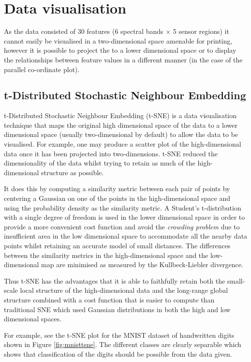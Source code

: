 \section{Data visualisation}

As the data consisted of 30 features (6 spectral bands $\times$ 5 sensor regions) it cannot easily be visualised in a two-dimensional space amenable for printing, however it is possible to project the to a lower dimensional space or to display the relationships between feature values in a different manner (in the case of the parallel co-ordinate plot).


\subsection{t-Distributed Stochastic Neighbour Embedding}

t-Distributed Stochastic Neighbour Embedding (t-SNE)\cite{Maaten2008} is a data visualisation technique that maps the original high dimensional space of the data to a lower dimensional space (usually two-dimensional by default) to allow the data to be visualised. For example, one may produce a scatter plot of the high-dimensional data once it has been projected into two-dimensions. t-SNE reduced the dimensionality of the data whilst trying to retain as much of the high-dimensional structure as possible.

 It does this by computing a similarity metric between each pair of points by centering a Gaussian on one of the points in the high-dimensional space and using the probability density as the similarity metric. A Student's t-distribution with a single degree of freedom is used in the lower dimensional space in order to provide a more convenient cost function and avoid the \textit{crowding problem} due to insufficient area in the low dimensional space to accommodate all the nearby data points whilst retaining an accurate model of small distances. The differences between the similarity metrics in the high-dimensional space and the low-dimensional map are minimised as measured by the Kullbeck-Liebler divergence.\cite{Maaten2008}

 Thus t-SNE has the advantages that it is able to faithfully retain both the small-scale local structure of the high-dimensional data and the long-range global structure combined with a cost function that is easier to compute than traditional SNE which used Gaussian distributions in both the high and low dimensional spaces.\cite{Maaten2008}

 For example, see the t-SNE plot for the MNIST dataset of handwritten digits shown in Figure \ref{fig:mnisttsne}. The different classes are clearly separable which shows that classification of the digits should be possible from the data given.



